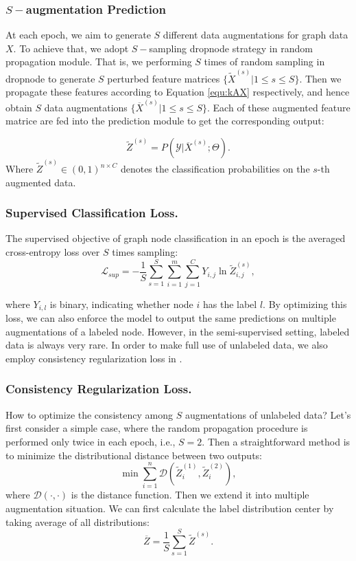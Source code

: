 { 
\subsubsection{$S-$augmentation Prediction}
At each epoch, we aim to generate $S$ different data augmentations for graph data $X$. To achieve that, we adopt $S-$sampling dropnode strategy in random propagation module. That is, we performing $S$ times of random sampling in dropnode to generate $S$ perturbed feature matrices $\{\widetilde{X}^{(s)}|1\leq s \leq S\}$. Then we propagate these features according to Equation \ref{equ:kAX} respectively, and hence obtain $S$ data augmentations $\{\overline{X}^{(s)}|1 \leq s \leq S\}$. Each of these augmented feature matrice are fed into the prediction module to get the corresponding output:

\begin{equation}
     \widetilde{Z}^{(s)} = P(\mathcal{Y}|\overline{X}^{(s)}; \Theta).
 \end{equation}
Where $\widetilde{Z}^{(s)} \in (0,1)^{n\times C}$ denotes the classification probabilities on the $s$-th augmented data. 
\subsubsection{Supervised Classification Loss.}
The supervised objective of graph node classification in an epoch is the averaged cross-entropy loss over $S$ times sampling:
\begin{equation}
\label{equ:loss}
	\mathcal{L}_{sup} = -\frac{1}{S}\sum_{s=1}^{S}\sum_{i=1}^m \sum_{j=1}^{C}Y_{i,j} \ln \widetilde{Z}_{i,j}^{(s)} ,
\end{equation}

\noindent where $Y_{i,l}$ is binary, indicating whether node $i$ has the label $l$. By optimizing this loss, we can also enforce the model to output the same predictions on multiple augmentations of a labeled node.
 However, in the semi-supervised setting, labeled data is always very rare. In order to make full use of unlabeled data, we also employ consistency regularization loss in \model. 
 
\subsubsection{Consistency Regularization Loss.} How to optimize the consistency among $S$ augmentations of unlabeled data? 
 Let's first consider a simple case, where the random propagation procedure is performed only twice in each epoch, i.e., $S=2$. Then a straightforward method is to minimize the distributional distance between two outputs:
 \begin{equation}
 \label{equ:2d}
     \min \sum_{i=1}^n \mathcal{D}(\widetilde{Z}^{(1)}_i, \widetilde{Z}^{(2)}_i),
 \end{equation}
where $ \mathcal{D}(\cdot,\cdot)$ is the distance function. Then we extend it into multiple augmentation situation. We can first calculate the label distribution center by taking average of all distributions:
\begin{equation}
    \overline{Z} = \frac{1}{S}\sum_{s=1}^{S} \widetilde{Z}^{(s)}.
\end{equation}

}

